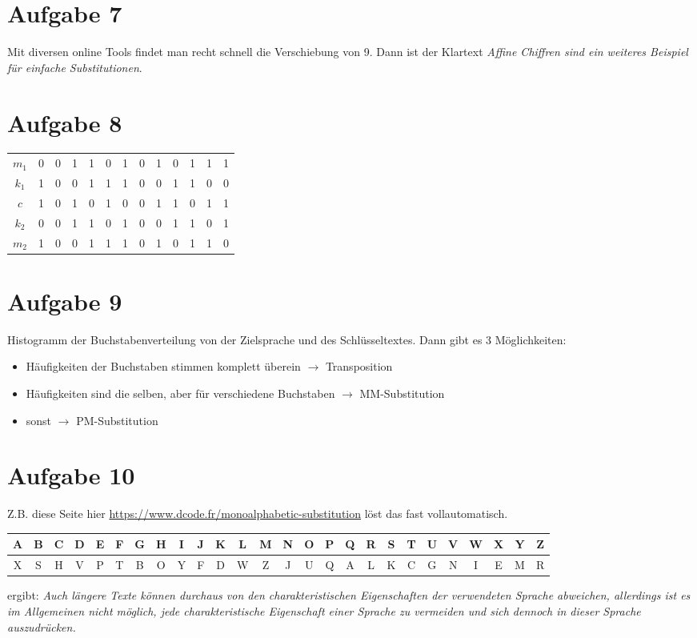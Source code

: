 \documentclass{article}
\begin{document}
	\section*{Aufgabe 7}
	Mit diversen online Tools findet man recht schnell die Verschiebung von 9. Dann ist der Klartext \textit{Affine Chiffren sind ein weiteres Beispiel für einfache Substitutionen}.

	\section*{Aufgabe 8}
	\begin{center}
		\begin{tabular}{c|cccccccccccc}
			$m_1$ & 0 & 0 & 1 & 1 & 0 & 1 & 0 & 1 & 0 & 1 & 1 & 1 \\
			$k_1$ & 1 & 0 & 0 & 1 & 1 & 1 & 0 & 0 & 1 & 1 & 0 & 0 \\
			\hline
			$c$ & 1 & 0 & 1 & 0 & 1 & 0 & 0 & 1 & 1 & 0 & 1 & 1 \\
			\hline
			$k_2$ & 0 & 0 & 1 & 1 & 0 & 1 & 0 & 0 & 1 & 1 & 0 & 1\\
			$m_2$ & 1 & 0 & 0 & 1 & 1 & 1 & 0 & 1 & 0 & 1 & 1 & 0
		\end{tabular}
	\end{center}
	
	\section*{Aufgabe 9}
	Histogramm der Buchstabenverteilung von der Zielsprache und des Schlüsseltextes. Dann gibt es 3 Möglichkeiten:
	\begin{itemize}
		\item Häufigkeiten der Buchstaben stimmen komplett überein $\to$ Transposition
		\item Häufigkeiten sind die selben, aber für verschiedene Buchstaben $\to$ MM-Substitution
		\item sonst $\to$ PM-Substitution
	\end{itemize}
	
	\section*{Aufgabe 10}
	Z.B. diese Seite hier \url{https://www.dcode.fr/monoalphabetic-substitution} löst das fast vollautomatisch.
	\begin{center}
		\begin{tabular}{cccccccccccccccccccccccccc}
			A & B & C & D & E & F & G & H & I & J & K & L & M & N & O & P & Q & R & S & T & U & V & W & X & Y & Z \\
			\hline
			X & S & H & V & P & T & B & O & Y & F & D & W & Z & J & U & Q & A & L & K & C & G & N & I & E & M & R
		\end{tabular}
	\end{center}
	ergibt: \textit{Auch längere Texte können durchaus von den charakteristischen Eigenschaften der verwendeten Sprache abweichen, allerdings ist es im Allgemeinen nicht möglich, jede charakteristische Eigenschaft einer Sprache zu vermeiden und sich dennoch in dieser Sprache auszudrücken.}
\end{document}
